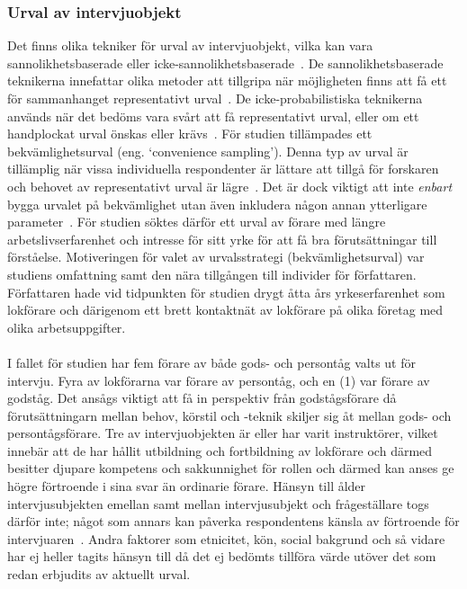 \subsubsection{Urval av intervjuobjekt}
Det finns olika tekniker för urval av intervjuobjekt, vilka kan vara sannolikhetsbaserade eller icke-sannolikhetsbaserade~\cite{Oates2005}.
De sannolikhetsbaserade teknikerna innefattar olika metoder att tillgripa när möjligheten finns att få ett för sammanhanget representativt urval~\cite{Oates2005}.
De icke-probabilistiska teknikerna används när det bedöms vara svårt att få representativt urval, eller om ett handplockat urval önskas eller krävs~\cite{Oates2005}.
För studien tillämpades ett bekvämlighetsurval (eng. \lq{}convenience sampling\rq{}).
Denna typ av urval är tillämplig när vissa individuella respondenter är lättare att tillgå för forskaren och behovet av representativt urval är lägre~\cite{Oates2005}.
Det är dock viktigt att inte \emph{enbart} bygga urvalet på bekvämlighet utan även inkludera någon annan ytterligare parameter~\cite{Oates2005}.
För studien söktes därför ett urval av förare med längre arbetslivserfarenhet och intresse för sitt yrke för att få bra förutsättningar till förståelse.
Motiveringen för valet av urvalsstrategi (bekvämlighetsurval) var studiens omfattning samt den nära tillgången till individer för författaren.
Författaren hade vid tidpunkten för studien drygt åtta års yrkeserfarenhet som lokförare och därigenom ett brett kontaktnät av lokförare på olika företag med olika arbetsuppgifter.
\paragraph{}
\hspace{-11pt}I fallet för studien har fem förare av både gods- och persontåg valts ut för intervju.
Fyra av lokförarna var förare av persontåg, och en (1) var förare av godståg.
Det ansågs viktigt att få in perspektiv från godstågsförare då förutsättningarn mellan behov, körstil och -teknik skiljer sig åt mellan gods- och persontågsförare.
Tre av intervjuobjekten är eller har varit instruktörer, vilket innebär att de har hållit utbildning och fortbildning av lokförare och därmed besitter djupare kompetens och sakkunnighet för rollen och därmed kan anses ge högre förtroende i sina svar än ordinarie förare.
Hänsyn till ålder intervjusubjekten emellan samt mellan intervjusubjekt och frågeställare togs därför inte; något som annars kan påverka respondentens känsla av förtroende för intervjuaren~\cite{Oates2005}.
Andra faktorer som etnicitet, kön, social bakgrund och så vidare har ej heller tagits hänsyn till då det ej bedömts tillföra värde utöver det som redan erbjudits av aktuellt urval.